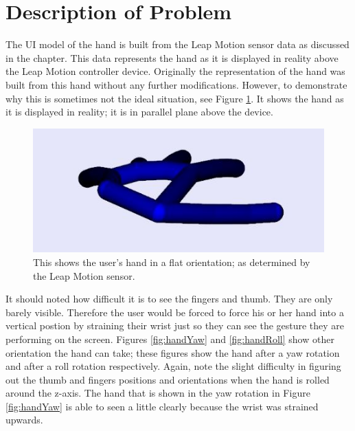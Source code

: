\section{Description of Problem}
The UI model of the hand is built from the Leap Motion sensor data as discussed in the chapter. This data represents the hand as it is displayed in reality above the Leap Motion controller device. Originally the representation of the hand was built from this hand without any further modifications. However, to demonstrate why this is sometimes not the ideal situation, see Figure \ref{fig:handFlat}. It shows the hand as it is displayed in reality; it is in parallel plane above the device. 
\begin{figure}[H]
\centering
\includegraphics[scale=0.45]{Figures/4_handFlat.JPG}
\caption[Hand in Flat Orientation]{This shows the user's hand in a flat orientation; as determined by the Leap Motion sensor.}
\label{fig:handFlat}
\end{figure}
It should noted how difficult it is to see the fingers and thumb. They are only barely visible. Therefore the user would be forced to force his or her hand into a vertical postion by straining their wrist just so they can see the gesture they are performing on the screen. Figures \ref{fig:handYaw} and \ref{fig:handRoll} show other orientation the hand can take; these figures show the hand after a yaw rotation and after a roll rotation respectively. Again, note the slight difficulty in figuring out the thumb and fingers positions and orientations when the hand is rolled around the z-axis. The hand that is shown in the yaw rotation in Figure \ref{fig:handYaw} is able to seen a little clearly because the wrist was strained upwards. 
